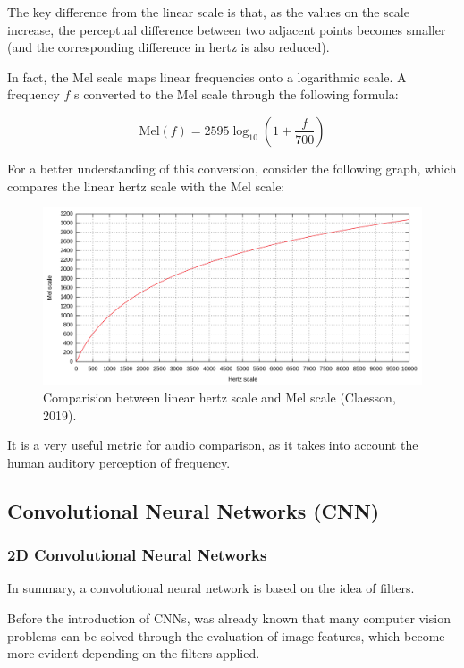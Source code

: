 \documentclass[sigconf,natbib=false]{acmart}
\begin{document}
The key difference from the linear scale is that, as the values on the scale increase, the perceptual difference between two adjacent points becomes smaller (and the corresponding difference in hertz is also reduced).

In fact, the Mel scale maps linear frequencies onto a logarithmic scale. A frequency \( f \) s converted to the Mel scale through the following formula:

\[
\text{Mel}(f) = 2595 \log_{10} \left( 1 + \frac{f}{700} \right)
\]

For a better understanding of this conversion, consider the following graph, which compares the linear hertz scale with the Mel scale:

\begin{figure}[h]
 \centering
 \includegraphics[width=\linewidth]{figs/mel_scale.png}
 \caption{Comparision between linear hertz scale and Mel scale (Claesson, 2019).}
\end{figure}

It is a very useful metric for audio comparison, as it takes into account the human auditory perception of frequency.

\subsection{Convolutional Neural Networks (CNN)}

\subsubsection{2D Convolutional Neural Networks}

In summary, a convolutional neural network is based on the idea of filters.

Before the introduction of CNNs, was already known that many computer vision problems can be solved through the evaluation of image features, which become more evident depending on the filters applied.
\end{document}
